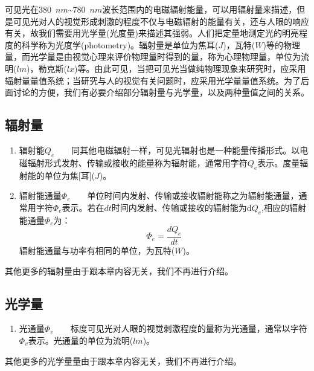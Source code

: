 可见光在380~$nm$\~{}780~$nm$波长范围内的电磁辐射能量，可以用辐射量来描述，但是可见光对人的视觉形成刺激的程度不仅与电磁辐射的能量有关，还与人眼的响应有关，故我们需要用光学量(光度量)来描述其强弱。人们把定量地测定光的明亮程度的科学称为光度学(photometry)。辐射量是单位为焦耳($J$)，瓦特($W$)等的物理量，而光学量是由视觉心理来评价物理量时得到的量，称为心理物理量，单位为流明($lm$)，勒克斯($lx$)等。由此可见，当把可见光当做纯物理现象来研究时，应采用辐射量量值系统；当研究与人的视觉有关问题时，应采用光学量量值系统。为了后面讨论的方便，我们有必要介绍部分辐射量与光学量，以及两种量值之间的关系\cite{ydy2011gcgx,lxt2007jhgx}。

\subsection{辐射量}

\begin{enumerate}[(1)]
	\item
	辐射能$Q_{e}$~~~~同其他电磁辐射一样，可见光辐射也是一种能量传播形式。以电磁辐射形式发射、传输或接收的能量称为辐射能，通常用字符$Q_{e}$表示。度量辐射能的单位为焦[耳]($J$)。
	\item 
	辐射能通量$\Phi_{e}$~~~~单位时间内发射、传输或接收辐射能称之为辐射能通量，通常用字符$\Phi_{e}$表示。若在$dt$时间内发射、传输或接收的辐射能为d$Q_{e}$,相应的辐射能通量$\Phi_{e}$为：
	\begin{equation}
	\label{radiation_rate}
	\Phi_{e} = \dfrac{dQ_{e}}{dt}
	\end{equation}
	辐射能通量与功率有相同的单位，为瓦特($W$)。
	
\end{enumerate}
其他更多的辐射量由于跟本章内容无关，我们不再进行介绍。

\subsection{光学量}
\begin{enumerate}[]
	\item 
	光通量$\Phi_{v}$~~~~标度可见光对人眼的视觉刺激程度的量称为光通量，通常以字符$\Phi_{v}$表示。光通量的单位为流明($lm$)。
\end{enumerate}

其他更多的光学量量由于跟本章内容无关，我们不再进行介绍。

